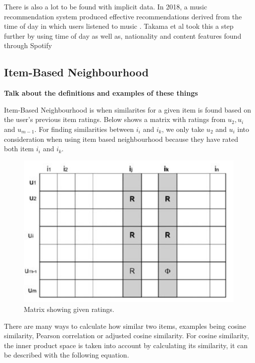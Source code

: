 There is also a lot to be found with implicit data. In 2018, a music recommendation system produced effective recommendations derived from the time of day in which users listened to music \citep{sanchez-moreno_incorporating_2018}. Takama et al took this a step further by using time of day as well as, nationality and content features found through Spotify \citep{takama_context-aware_2021} 

\subsection{Item-Based Neighbourhood }

\textbf{Talk about the definitions and examples of these things \citep{ricci_recommender_2011}}

Item-Based Neighbourhood is when similarites for a given item is found based on the user's previous item ratings. Below shows a matrix with ratings from  $u_{2}, u_{i}$ and $u_{m-1}$. For finding similarities between $i_{i}$ and $i_{k}$, we only take $u_{2}$ and  $u_{i}$ into consideration when using item based neighbourhood because they have rated both item $i_{i}$ and $i_{k}$.  

\begin{figure}[H]
	\includegraphics[scale=0.65]{images/neigbourhood_based}
	\centering
	\caption{Matrix showing given ratings. \citep{celma_recommendation_2010}} 
\end{figure}

There are many ways to calculate how similar two items, examples being cosine similarity, Pearson correlation or adjusted cosine similarity. For cosine similarity, the inner product space is taken into account by calculating its similarity, it can be described with the following equation.

